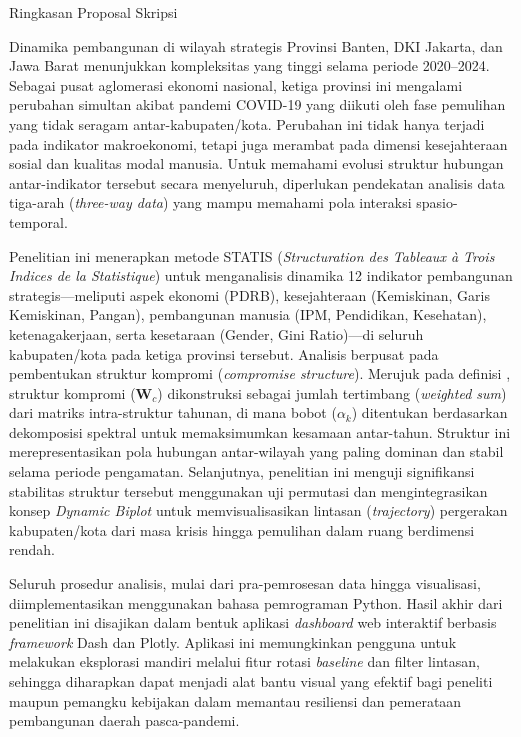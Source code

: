 \documentclass[a4paper]{article}
\theoremstyle{definition} %
\begin{document}
\newpage
\linenumbers
\LARGE
\centerline{Ringkasan Proposal Skripsi}
\vskip1.5cm
\normalsize

Dinamika pembangunan di wilayah strategis Provinsi Banten, DKI Jakarta, dan Jawa Barat menunjukkan kompleksitas yang tinggi selama periode 2020--2024. Sebagai pusat aglomerasi ekonomi nasional, ketiga provinsi ini mengalami perubahan simultan akibat pandemi COVID-19 yang diikuti oleh fase pemulihan yang tidak seragam antar-kabupaten/kota. Perubahan ini tidak hanya terjadi pada indikator makroekonomi, tetapi juga merambat pada dimensi kesejahteraan sosial dan kualitas modal manusia. Untuk memahami evolusi struktur hubungan antar-indikator tersebut secara menyeluruh, diperlukan pendekatan analisis data tiga-arah (\textit{three-way data}) yang mampu memahami pola interaksi spasio-temporal.

Penelitian ini menerapkan metode STATIS (\textit{Structuration des Tableaux à Trois Indices de la Statistique}) untuk menganalisis dinamika 12 indikator pembangunan strategis---meliputi aspek ekonomi (PDRB), kesejahteraan (Kemiskinan, Garis Kemiskinan, Pangan), pembangunan manusia (IPM, Pendidikan, Kesehatan), ketenagakerjaan, serta kesetaraan (Gender, Gini Ratio)---di seluruh kabupaten/kota pada ketiga provinsi tersebut. Analisis berpusat pada pembentukan struktur kompromi (\textit{compromise structure}). Merujuk pada definisi \citet{lavit94}, struktur kompromi ($\mathbf{W}_c$) dikonstruksi sebagai jumlah tertimbang (\textit{weighted sum}) dari matriks intra-struktur tahunan, di mana bobot ($\alpha_k$) ditentukan berdasarkan dekomposisi spektral untuk memaksimumkan kesamaan antar-tahun. Struktur ini merepresentasikan pola hubungan antar-wilayah yang paling dominan dan stabil selama periode pengamatan. Selanjutnya, penelitian ini menguji signifikansi stabilitas struktur tersebut menggunakan uji permutasi dan mengintegrasikan konsep \textit{Dynamic Biplot} untuk memvisualisasikan lintasan (\textit{trajectory}) pergerakan kabupaten/kota dari masa krisis hingga pemulihan dalam ruang berdimensi rendah.

Seluruh prosedur analisis, mulai dari pra-pemrosesan data hingga visualisasi, diimplementasikan menggunakan bahasa pemrograman Python. Hasil akhir dari penelitian ini disajikan dalam bentuk aplikasi \textit{dashboard} web interaktif berbasis \textit{framework} Dash dan Plotly. Aplikasi ini memungkinkan pengguna untuk melakukan eksplorasi mandiri melalui fitur rotasi \textit{baseline} dan filter lintasan, sehingga diharapkan dapat menjadi alat bantu visual yang efektif bagi peneliti maupun pemangku kebijakan dalam memantau resiliensi dan pemerataan pembangunan daerah pasca-pandemi.
\end{document}
